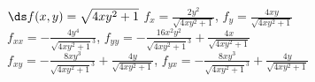 {$\ds f(x,y) = \sqrt{4xy^2+1}$
}
{$f_x=\frac{2y^2}{\sqrt{4xy^2+1}}$, $f_y=\frac{4xy}{\sqrt{4xy^2+1}}$\\
$f_{xx}=-\frac{4y^4}{\sqrt{4xy^2+1}^3}$, $f_{yy}=-\frac{16x^2y^2}{\sqrt{4xy^2+1}^3}+\frac{4x}{\sqrt{4xy^2+1}}$\\
$f_{xy}=-\frac{8xy^3}{\sqrt{4xy^2+1}^3}+\frac{4y}{\sqrt{4xy^2+1}}$, $f_{yx}=-\frac{8xy^3}{\sqrt{4xy^2+1}^3}+\frac{4y}{\sqrt{4xy^2+1}}$\\
}